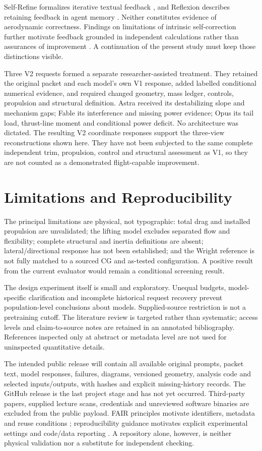 \documentclass[11pt,a4paper]{article}
\begin{document}
Self-Refine formalizes iterative textual feedback \cite{ref30}, and Reflexion describes retaining feedback in agent memory \cite{ref32}. Neither constitutes evidence of aerodynamic correctness. Findings on limitations of intrinsic self-correction further motivate feedback grounded in independent calculations rather than assurances of improvement \cite{ref31}. A continuation of the present study must keep those distinctions visible.

Three V2 requests formed a separate researcher-assisted treatment. They retained the original packet and each model's own V1 response, added labelled conditional numerical evidence, and required changed geometry, mass ledger, controls, propulsion and structural definition. Astra received its destabilizing slope and mechanism gaps; Fable its interference and missing power evidence; Opus its tail load, thrust-line moment and conditional power deficit. No architecture was dictated. The resulting V2 coordinate responses support the three-view reconstructions shown here. They have not been subjected to the same complete independent trim, propulsion, control and structural assessment as V1, so they are not counted as a demonstrated flight-capable improvement.

\section{Limitations and Reproducibility}
The principal limitations are physical, not typographic: total drag and installed propulsion are unvalidated; the lifting model excludes separated flow and flexibility; complete structural and inertia definitions are absent; lateral/directional response has not been established; and the Wright reference is not fully matched to a sourced CG and as-tested configuration. A positive result from the current evaluator would remain a conditional screening result.

The design experiment itself is small and exploratory. Unequal budgets, model-specific clarification and incomplete historical request recovery prevent population-level conclusions about models. Supplied-source restriction is not a pretraining cutoff. The literature review is targeted rather than systematic; access levels and claim-to-source notes are retained in an annotated bibliography. References inspected only at abstract or metadata level are not used for uninspected quantitative details.

The intended public release will contain all available original prompts, packet text, model responses, failures, diagrams, versioned geometry, analysis code and selected inputs/outputs, with hashes and explicit missing-history records. The GitHub release is the last project stage and has not yet occurred. Third-party papers, supplied lecture scans, credentials and unreviewed software binaries are excluded from the public payload. FAIR principles motivate identifiers, metadata and reuse conditions \cite{ref33}; reproducibility guidance motivates explicit experimental settings and code/data reporting \cite{ref34}. A repository alone, however, is neither physical validation nor a substitute for independent checking.
\end{document}
